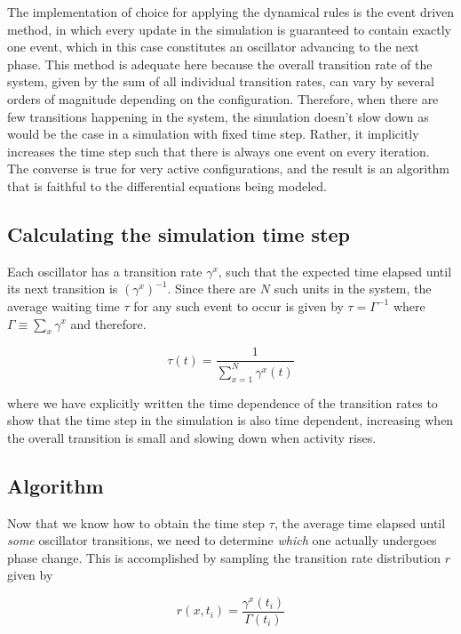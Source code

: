 The implementation of choice for applying the dynamical rules is the event driven method, in which every update in the simulation is
guaranteed to contain exactly one event, which in this case constitutes an oscillator advancing to the next phase. This method is
adequate here because the overall transition rate of the system, given by the sum of all individual transition rates, can vary by
several orders of magnitude depending on the configuration. Therefore, when there are few transitions happening in the system, the
simulation doesn't slow down as would be the case in a simulation with fixed time step. Rather, it implicitly increases the
time step such that there is always one event on every iteration. The converse is true for very active configurations, and the result
is an algorithm that is faithful to the differential equations being modeled.

\subsection*{Calculating the simulation time step}

Each oscillator has a transition rate $\gamma^x$, such that the expected time elapsed until its next transition is $(\gamma^x)^{-1}$.
Since there are $N$ such units in the system, the average waiting time $\tau$ for any such event to occur is given by $\tau =
\Gamma^{-1}$ where $\Gamma \equiv \sum_x \gamma^x$ and therefore.

\begin{equation}
	\tau(t) = \frac{1}{\sum\limits_{x=1}^N \gamma^x(t)}
\end{equation}

\noindent where we have explicitly written the time dependence of the transition rates to show that the time step in the simulation is
also time dependent, increasing when the overall transition is small and slowing down when activity rises.

\subsection*{Algorithm}

Now that we know how to obtain the time step $\tau$, the average time elapsed until \textit{some} oscillator transitions, we need to
determine \textit{which} one actually undergoes phase change. This is accomplished by sampling the transition rate distribution $r$
given by

\begin{equation}
	r(x,t_i)=\frac{\gamma^x(t_i)}{\Gamma(t_i)}
\end{equation}

